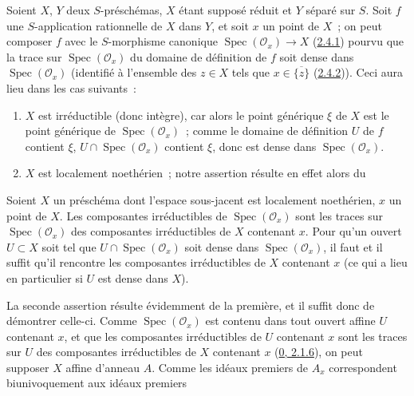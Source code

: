 \begin{env}[7.2.8]
\label{I.7.2.8-fr}
Soient $X$, $Y$ deux $S$-préschémas, $X$ étant supposé réduit et $Y$ séparé
sur $S$. Soit $f$ une $S$-application rationnelle de $X$ dans $Y$, et soit
$x$ un point de $X$~; on peut composer $f$ avec le $S$-morphisme canonique
$\operatorname{Spec}(\mathscr{O}_x)\to X$
(\hyperref[I.2.4.1-fr]{2.4.1}) pourvu que la trace sur
$\operatorname{Spec}(\mathscr{O}_x)$ du domaine de définition de $f$ soit
dense dans $\operatorname{Spec}(\mathscr{O}_x)$ (identifié à l'ensemble des
$z\in X$ tels que $x\in\overline{\{z\}}$
(\hyperref[I.2.4.2-fr]{2.4.2})). Ceci aura lieu dans les cas suivants~:
\begin{enumerate}
  \item[1\textsuperscript{o}] $X$ est irréductible (donc intègre), car alors
    le point générique $\xi$ de $X$ est le point générique de
    $\operatorname{Spec}(\mathscr{O}_x)$~; comme le domaine de définition $U$
    de $f$ contient $\xi$, $U\cap\operatorname{Spec}(\mathscr{O}_x)$ contient
    $\xi$, donc est dense dans $\operatorname{Spec}(\mathscr{O}_x)$.
  \item[2\textsuperscript{o}] $X$ est localement noethérien~; notre assertion
    résulte en effet alors du
\end{enumerate}
\end{env}

\begin{lemma}[7.2.8.1]
\label{I.7.2.8.1-fr}
Soient $X$ un préschéma dont l'espace sous-jacent est localement noethérien,
$x$ un point de $X$. Les composantes irréductibles de
$\operatorname{Spec}(\mathscr{O}_x)$ sont les traces sur
$\operatorname{Spec}(\mathscr{O}_x)$ des composantes irréductibles de $X$
contenant $x$. Pour qu'un ouvert $U\subset X$ soit tel que
$U\cap\operatorname{Spec}(\mathscr{O}_x)$ soit dense dans
$\operatorname{Spec}(\mathscr{O}_x)$, il faut et il suffit qu'il rencontre les
composantes irréductibles de $X$ contenant $x$ (ce qui a lieu en particulier
si $U$ est dense dans $X$).
\end{lemma}

La seconde assertion résulte évidemment de la première, et il suffit donc de
démontrer celle-ci. Comme $\operatorname{Spec}(\mathscr{O}_x)$ est contenu
dans tout ouvert affine $U$ contenant $x$, et que les composantes
irréductibles de $U$ contenant $x$ sont les traces sur $U$ des composantes
irréductibles de $X$ contenant $x$
(\hyperref[0.2.1.6-fr]{0, 2.1.6}), on peut supposer $X$ affine d'anneau $A$.
Comme les idéaux premiers de $A_x$ correspondent biunivoquement aux idéaux
premiers
